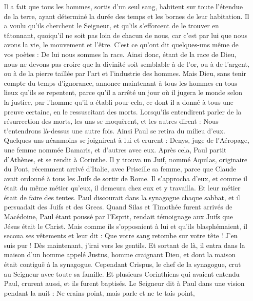 \begin{multicols}{2}
Il a fait que tous les hommes, sortis d’un seul sang, habitent sur toute l'étendue de la terre, ayant déterminé la durée des temps et les bornes de leur habitation.
Il a voulu qu'ils cherchent le Seigneur, et qu’ils s’efforcent de le trouver en tâtonnant, quoiqu'il ne soit pas loin de chacun de nous,
car c’est par lui que nous avons la vie, le mouvement et l'être. C’est ce qu’ont dit quelques-uns même de vos poètes : De lui nous sommes la race.
Ainsi donc, étant de la race de Dieu, nous ne devons pas croire que la divinité soit semblable à de l'or, ou à de l'argent, ou à de la pierre taillée par l'art et l'industrie des hommes.
Mais Dieu, sans tenir compte du temps d’ignorance, annonce maintenant à tous les hommes en tous lieux qu'ils se repentent,
parce qu'il a arrêté un jour où il jugera le monde selon la justice, par l'homme qu'il a établi pour cela, ce dont il a donné à tous une preuve certaine, en le ressuscitant des morts.
Lorsqu’ils entendirent parler de la résurrection des morts, les uns se moquèrent, et les autres dirent : Nous t'entendrons là-dessus une autre fois.
Ainsi Paul se retira du milieu d'eux.
Quelques-uns néanmoins se joignirent à lui et crurent : Denys, juge de l’Aéropage, une femme nommée Damaris, et d’autres avec eux.
\VerseOne{}Après cela, Paul partit d'Athènes, et se rendit à Corinthe.
Il y trouva un Juif, nommé Aquilas, originaire du Pont, récemment arrivé d'Italie, avec Priscille sa femme, parce que Claude avait ordonné à tous les Juifs de sortir de Rome. Il s’approcha d’eux,
et comme il était du même métier qu’eux, il demeura chez eux et y travailla. Et leur métier était de faire des tentes.
Paul discourait dans la synagogue chaque sabbat, et il persuadait des Juifs et des Grecs.
Quand Silas et Timothée furent arrivés de Macédoine, Paul étant poussé par l'Esprit, rendait témoignage aux Juifs que Jésus était le Christ.
Mais comme ils s’opposaient à lui et qu'ils blasphémaient, il secoua ses vêtements et leur dit : Que votre sang retombe sur votre tête ! J’en suis pur ! Dès maintenant, j’irai vers les gentils.
Et sortant de là, il entra dans la maison d'un homme appelé Justus, homme craignant Dieu, et dont la maison était contiguë à la synagogue.
Cependant Crispus, le chef de la synagogue, crut au Seigneur avec toute sa famille. Et plusieurs Corinthiens qui avaient entendu Paul, crurent aussi, et ils furent baptisés.
Le Seigneur dit à Paul dans une vision pendant la nuit : Ne crains point, mais parle et ne te tais point,

\end{multicols}

